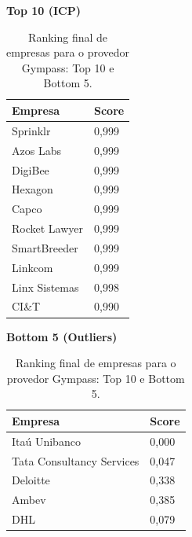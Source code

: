 \begin{table}[p]
    \centering
    \caption{Ranking final de empresas para o provedor Gympass: Top 10 e Bottom 5.}
    \label{tab:7_6_ranking_gympass}
    \begin{minipage}{0.48\textwidth}
    \centering
    \textbf{Top 10 (ICP)}\\
    \begin{tabular}{p{5cm}p{1.8cm}}
    \toprule
    Empresa & Score \\
    \midrule
    Sprinklr & 0,999 \\
    Azos Labs & 0,999 \\
    DigiBee & 0,999 \\
    Hexagon & 0,999 \\
    Capco & 0,999 \\
    Rocket Lawyer & 0,999 \\
    SmartBreeder & 0,999 \\
    Linkcom & 0,999 \\
    Linx Sistemas & 0,998 \\
    CI\&T & 0,990 \\
    \bottomrule
    \end{tabular}
    \end{minipage}\hfill
    \begin{minipage}{0.48\textwidth}
    \centering
    \textbf{Bottom 5 (Outliers)}\\
    \begin{tabular}{p{5cm}p{1.8cm}}
    \toprule
    Empresa & Score \\
    \midrule
    Itaú Unibanco & 0,000 \\
    Tata Consultancy Services & 0,047 \\
    Deloitte & 0,338 \\
    Ambev & 0,385 \\
    DHL & 0,079 \\
    \bottomrule
    \end{tabular}
    \end{minipage}
\end{table}
